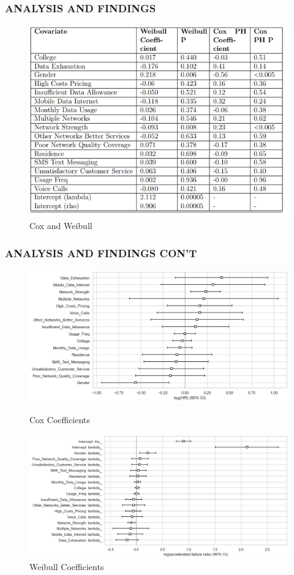 \documentclass{beamer}
\begin{document}
	
	\begin{frame}
		\frametitle{ANALYSIS AND FINDINGS}
		\begin{figure}
			\centering
			\includegraphics[width=0.5\linewidth]{Presentation/cox and weilbull.png}
			\caption{Cox and Weibull}
			\label{Figure 2}
		\end{figure}
	\end{frame}
	
	
	\begin{frame}
		\frametitle{ANALYSIS AND FINDINGS CON'T}
		\begin{figure}[H]
			\centering
			\begin{minipage}{0.48\textwidth}
				\centering
				\includegraphics[width=\textwidth]{Figure 4/4.2.png}
				\caption{Cox Coefficients}
				\label{Figure 3}
			\end{minipage}\hfill
			\begin{minipage}{0.48\textwidth}
				\centering
				\includegraphics[width=\textwidth]{Figure 4/4.4.png}
				\caption{Weibull Coefficients}
				\label{Figure 4}
				
			\end{minipage}
		\end{figure}
	\end{frame}
	
\end{document}

